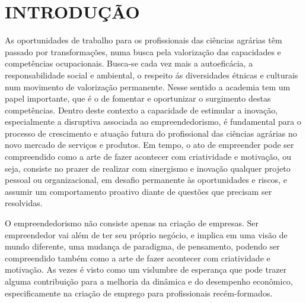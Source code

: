 \chapter{INTRODUÇÃO}

As oportunidades de trabalho para os profissionais das ciências agrárias têm passado por transformações, numa busca pela valorização das capacidades e competências ocupacionais. Busca-se cada vez mais a autoeficácia, a responsabilidade social e ambiental, o respeito ás diversidades étnicas e culturais num movimento de valorização permanente. Nesse sentido a academia tem um papel importante, que é o de fomentar e oportunizar o surgimento destas competências. Dentro deste contexto a capacidade de estimular a inovação, especialmente a disruptiva associada ao empreendedorismo, é fundamental para o processo de crescimento e atuação futura do profissional das ciências agrárias no novo mercado de serviços e produtos. Em tempo, o ato de empreender pode ser compreendido como a arte de fazer acontecer com criatividade e motivação, ou seja, consiste no prazer de realizar com sinergismo e inovação qualquer projeto pessoal ou organizacional, em desafio permanente às oportunidades e riscos, e assumir um comportamento proativo diante de questões que precisam ser resolvidas.

O empreendedorismo não consiste apenas na criação de empresas. Ser empreendedor vai além de ter seu próprio negócio, e implica em uma visão de mundo diferente, uma mudança de paradigma, de pensamento, podendo ser compreendido também como a arte de fazer acontecer com criatividade e motivação. As vezes é visto como um vislumbre de esperança que pode trazer alguma contribuição para a melhoria da dinâmica e do desempenho econômico, especificamente na criação de emprego para profissionais recém-formados. 

